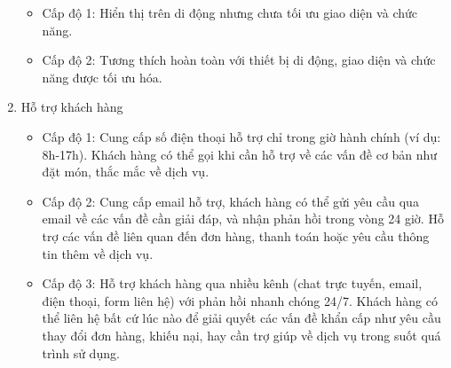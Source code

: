 \begin{enumerate}
\begin{itemize}
                    \item Cấp độ 1: Hiển thị trên di động nhưng chưa tối ưu giao diện và chức năng.
                    \item Cấp độ 2: Tương thích hoàn toàn với thiết bị di động, giao diện và chức năng được tối ưu hóa.
                \end{itemize}
            \item Hỗ trợ khách hàng
                \begin{itemize}
                    \item Cấp độ 1: Cung cấp số điện thoại hỗ trợ chỉ trong giờ hành chính (ví dụ: 8h-17h). Khách hàng có thể gọi khi cần hỗ trợ về các vấn đề cơ bản như đặt món, thắc mắc về dịch vụ.
                    \item Cấp độ 2: Cung cấp email hỗ trợ, khách hàng có thể gửi yêu cầu qua email về các vấn đề cần giải đáp, và nhận phản hồi trong vòng 24 giờ. Hỗ trợ các vấn đề liên quan đến đơn hàng, thanh toán hoặc yêu cầu thông tin thêm về dịch vụ.
                    \item Cấp độ 3: Hỗ trợ khách hàng qua nhiều kênh (chat trực tuyến, email, điện thoại, form liên hệ) với phản hồi nhanh chóng 24/7. Khách hàng có thể liên hệ bất cứ lúc nào để giải quyết các vấn đề khẩn cấp như yêu cầu thay đổi đơn hàng, khiếu nại, hay cần trợ giúp về dịch vụ trong suốt quá trình sử dụng.
                \end{itemize}
        \end{enumerate}


